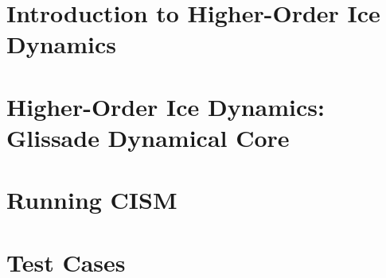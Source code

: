 \chapter{Introduction to Higher-Order Ice Dynamics}
\renewcommand{\dir}{higher-order}


\chapter{Higher-Order Ice Dynamics: Glissade Dynamical Core}
\renewcommand{\dir}{glissade}


%

\chapter{Running CISM}
\renewcommand{\dir}{run_cism}


\chapter{Test Cases}
\label{chp:testcases}
\renewcommand{\dir}{tests}




%


%

